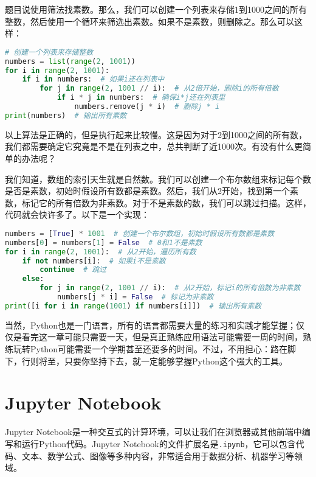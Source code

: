 \documentclass[../main.tex]{subfiles}
\begin{document}
\begin{answer}
  题目说使用筛法找素数。那么，我们可以创建一个列表来存储1到1000之间的所有整数，然后使用一个循环来筛选出素数。如果不是素数，则删除之。那么可以这样：

\begin{lstlisting}[language=python]
# 创建一个列表来存储整数
numbers = list(range(2, 1001))
for i in range(2, 1001):
    if i in numbers:  # 如果i还在列表中
        for j in range(2, 1001 // i):  # 从2倍开始，删除i的所有倍数
            if i * j in numbers:  # 确保i*j还在列表里
                numbers.remove(j * i)  # 删除j * i
print(numbers)  # 输出所有素数
\end{lstlisting}

  以上算法是正确的，但是执行起来比较慢。这是因为对于2到1000之间的所有数，我们都需要确定它究竟是不是在列表之中，总共判断了近1000次。有没有什么更简单的办法呢？

  我们知道，数组的索引天生就是自然数。我们可以创建一个布尔数组来标记每个数是否是素数，初始时假设所有数都是素数。然后，我们从2开始，找到第一个素数，标记它的所有倍数为非素数。对于不是素数的数，我们可以跳过扫描。这样，代码就会快许多了。以下是一个实现：

\begin{lstlisting}[language=python]
numbers = [True] * 1001  # 创建一个布尔数组，初始时假设所有数都是素数
numbers[0] = numbers[1] = False  # 0和1不是素数
for i in range(2, 1001):  # 从2开始，遍历所有数
    if not numbers[i]:  # 如果i不是素数
        continue  # 跳过
    else:
        for j in range(2, 1001 // i):  # 从2开始，标记i的所有倍数为非素数
            numbers[j * i] = False  # 标记为非素数
print([i for i in range(1001) if numbers[i]])  # 输出所有素数
\end{lstlisting}
\end{answer}

当然，Python也是一门语言，所有的语言都需要大量的练习和实践才能掌握；仅仅是看完这一章可能只需要一天，但是真正熟练应用语法可能需要一周的时间，熟练玩转Python可能需要一个学期甚至还要多的时间。不过，不用担心：路在脚下，行则将至，只要你坚持下去，就一定能够掌握Python这个强大的工具。

\section{Jupyter Notebook}

Jupyter Notebook是一种交互式的计算环境，可以让我们在浏览器或其他前端中编写和运行Python代码。Jupyter Notebook的文件扩展名是\texttt{.ipynb}，它可以包含代码、文本、数学公式、图像等多种内容，非常适合用于数据分析、机器学习等领域。
\end{document}
